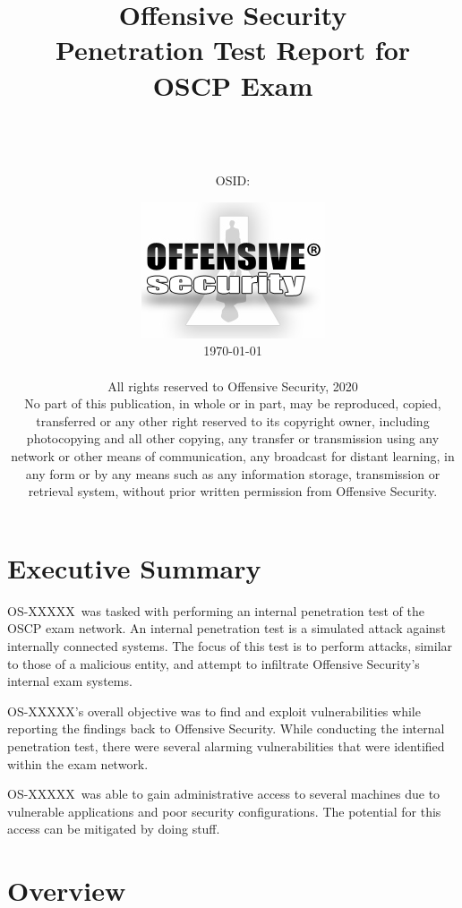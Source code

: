 \documentclass[a4paper, 10pt, oneside]{article}
\title{{\textbf{\Huge Offensive Security}}\\Penetration Test Report for\\OSCP Exam}
\author{\vspace{.8cm}\\{\LARGE \name}\\[1em]\email\\[1em]OSID: \osid}
\date{\vspace{1cm}\includegraphics{offsec_logo.png}\\\vspace{2cm} \today\\ \vspace{.25cm} \textcopyright\\\vspace{.25cm}
{\small All rights reserved to Offensive Security, 2020\\
No part of this publication, in whole or in part, may be reproduced, copied, transferred or any other right reserved to its copyright owner, including photocopying and all other copying, any transfer or transmission using any network or other means of communication, any broadcast for distant learning, in any form or by any means such as any information storage, transmission or retrieval system, without prior written permission from Offensive Security.}
}
\newcommand{\osid}{OS-XXXXX}
\begin{document}
\maketitle
\thispagestyle{empty}
\tableofcontents
\thispagestyle{empty}
\pagebreak 

\newcommand{\hostname}{}
\newcommand{\ip}{}
\newcommand{\tcpports}{} 
\newcommand{\udpports}{} 
\newcommand{\os}{}
\newcommand{\vuln}{}
\newcommand{\product}{}
\newcommand{\vulnx}{}
\newcommand{\productx}{}
\newcommand{\client}{\textit{kali (ZZ.ZZ.ZZ.ZZ)}}

\section{Executive Summary}
\osid\ was tasked with performing an internal penetration test of the OSCP exam network. An internal penetration test is a simulated attack against internally connected systems. The focus of this test is to perform attacks, similar to those of a malicious entity, and attempt to infiltrate Offensive Security’s internal exam systems.

\osid's overall objective was to find and exploit vulnerabilities while reporting the findings back to Offensive Security. While conducting the internal penetration test, there were several alarming vulnerabilities that were identified within the exam network. 

\par \osid\ was able to gain administrative access to several machines due to vulnerable applications and poor security configurations. The potential for this access can be mitigated by doing stuff.

\section{Overview}
\end{document}
